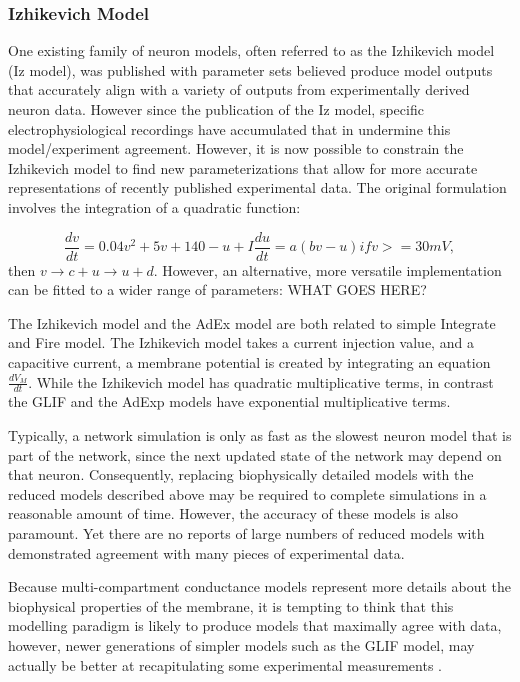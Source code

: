 \subsubsection{Izhikevich Model}
One existing family of neuron models, often referred to as the Izhikevich model \cite{izhikevich2003simple} (Iz model), was published with parameter sets believed produce model outputs that accurately align with a variety of outputs from experimentally derived neuron data. However since the publication of the Iz model, specific electrophysiological recordings have accumulated that in undermine this model/experiment agreement. However, it is now possible to constrain the Izhikevich model to find new parameterizations that allow for more accurate representations of recently published experimental data.
The original formulation involves the integration of a quadratic function:

\begin{displaymath}
\frac{dv}{dt}=0.04v^{2}+5v+140-u+I
\frac{du}{dt} = a(bv-u)
if v>=30mV,
\end{displaymath}
 then $ v \rightarrow c + u 	\rightarrow u+ d$.
However, an alternative, more versatile implementation can be fitted to a wider range of parameters:
WHAT GOES HERE?

The Izhikevich model and the AdEx model are both related to simple Integrate and Fire model.
The Izhikevich model takes a current injection value, and a capacitive current, a membrane potential is created by integrating an equation $\frac{dV_{M}}{dt}$.
While the Izhikevich model has quadratic multiplicative terms, in contrast the GLIF and the AdExp models have exponential multiplicative terms.

Typically, a network simulation is only as fast as the slowest neuron model that is part of the network, since the next updated state of the network may depend on that neuron.
Consequently, replacing biophysically detailed models with the reduced models described above may be required to complete simulations in a reasonable amount of time.
However, the accuracy of these models is also paramount.
Yet there are no reports of large numbers of reduced models with demonstrated agreement with many pieces of experimental data.

Because multi-compartment conductance models represent more details about the biophysical properties of the membrane, it is tempting to think that this modelling paradigm is likely to produce models that maximally agree with data, however, newer generations of simpler models such as the GLIF model, may actually be better at recapitulating some experimental measurements \cite{meunier2002playing}.

